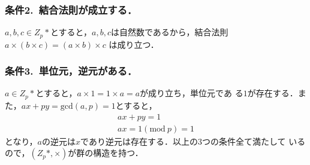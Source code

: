 \documentclass[a4paper,12pt]{jarticle}
\begin{document}
\subsubsection*{条件2.~結合法則が成立する．}
\vspace{-4mm}
$a,b,c\in Z_p*$とすると，$a,b,c$は自然数であるから，結合法則
$a \times (b \times c)=(a \times b) \times c$
は成り立つ．
%
\vspace{-6mm}
\subsubsection*{条件3.~単位元，逆元がある．}
\vspace{-4mm}
$a\in Z_p*$とすると，$a \times 1 = 1 \times a = a$が成り立ち，単位元であ
る$1$が存在する．また，$ax+py=\mathrm{gcd}(a,p)=1$とすると，
%
\begin{eqnarray}
 ax + py = 1\\
 ax = 1(\mathrm{mod}~p) = 1
\end{eqnarray}
%
となり，$a$の逆元は$x$であり逆元は存在する．以上の3つの条件全て満たして
いるので，$(Z_p*,\times)$が群の構造を持つ．
\vspace{-5mm}
\end{document}
